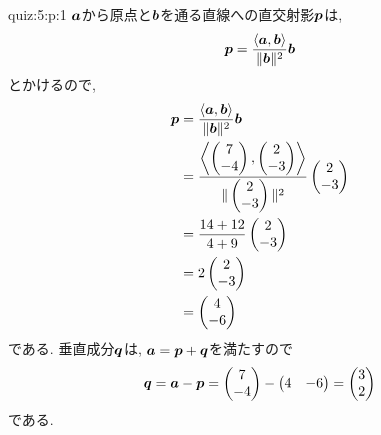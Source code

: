 \begin{answerof}{quiz:5:p:1}
$\boldsymbol{a}$から原点と$\boldsymbol{b}$を通る直線への直交射影$\boldsymbol{p}$は,
\begin{align*}
\boldsymbol{p}=\frac{\Braket{\boldsymbol{a},\boldsymbol{b}}}{\|\boldsymbol{b}\|^2}\boldsymbol{b}
\end{align*}
とかけるので,
\begin{align*}
  \boldsymbol{p}&=\frac{\Braket{\boldsymbol{a},\boldsymbol{b}}}{\|\boldsymbol{b}\|^2}\boldsymbol{b}\\
  &=\frac{\Braket{\begin{pmatrix}7\\-4\end{pmatrix},\begin{pmatrix}2\\-3\end{pmatrix}}}{\|\begin{pmatrix}2\\-3\end{pmatrix}\|^2}\begin{pmatrix}2\\-3\end{pmatrix}\\
  &=\frac{14+12}{4+9}\begin{pmatrix}2\\-3\end{pmatrix}\\
  &=2\begin{pmatrix}2\\-3\end{pmatrix}\\
  &=\begin{pmatrix}4\\-6\end{pmatrix}
\end{align*}
である.
垂直成分$\boldsymbol{q}$は,
$\boldsymbol{a}=\boldsymbol{p}+\boldsymbol{q}$を満たすので
\begin{align*}
  \boldsymbol{q}=\boldsymbol{a}-\boldsymbol{p}
  =\begin{pmatrix}7\\-4\end{pmatrix}-\begin{pmatrix}4&-6\end{pmatrix}
  =\begin{pmatrix}3\\2\end{pmatrix}
\end{align*}
である.
\end{answerof}

